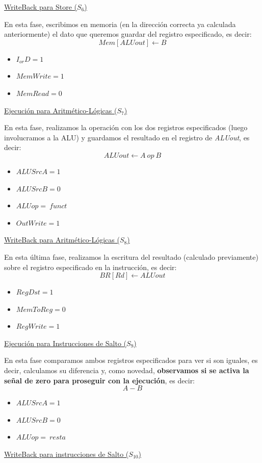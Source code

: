 \documentclass[a4paper,10pt]{book}
\begin{document}
\underline{WriteBack para Store ($S_6$)}

En esta fase, escribimos en memoria (en la dirección correcta ya calculada anteriormente) el dato que queremos guardar del registro especificado, es decir:
$$Mem[ALUout] \leftarrow B$$
\begin{itemize}
\item $I_{or}D = 1$
\item $MemWrite = 1$
\item $MemRead = 0$
\end{itemize}

\underline{Ejecución para Aritmético-Lógicas ($S_7$)}

En esta fase, realizamos la operación con los dos registros especificados (luego involucramos a la ALU) y guardamos el resultado en el registro de \textit{ALUout}, es decir:
$$ALUout \leftarrow A \ op \ B$$
\begin{itemize}
\item $ALUSrcA = 1$
\item $ALUSrcB = 0$
\item $ALUop = \ funct$
\item $OutWrite = 1$
\end{itemize}

\underline{WriteBack para Aritmético-Lógicas ($S_8$)}

En esta última fase, realizamos la escritura del resultado (calculado previamente) sobre el registro especificado en la instrucción, es decir:
$$BR[Rd] \leftarrow ALUout$$
\begin{itemize}
\item $RegDst = 1$
\item $MemToReg = 0$
\item $RegWrite = 1$
\end{itemize}

\underline{Ejecución para Instrucciones de Salto ($S_9$)}

En esta fase comparamos ambos registros especificados para ver si son iguales, es decir, calculamos su diferencia y, como novedad, \textbf{observamos si se activa la señal de zero para proseguir con la ejecución}, es decir:
$$A-B$$
\begin{itemize}
\item $ALUSrcA = 1$
\item $ALUSrcB = 0$
\item $ALUop = \ resta$
\end{itemize}

\underline{WriteBack para instrucciones de Salto ($S_{10}$)}
\end{document}
